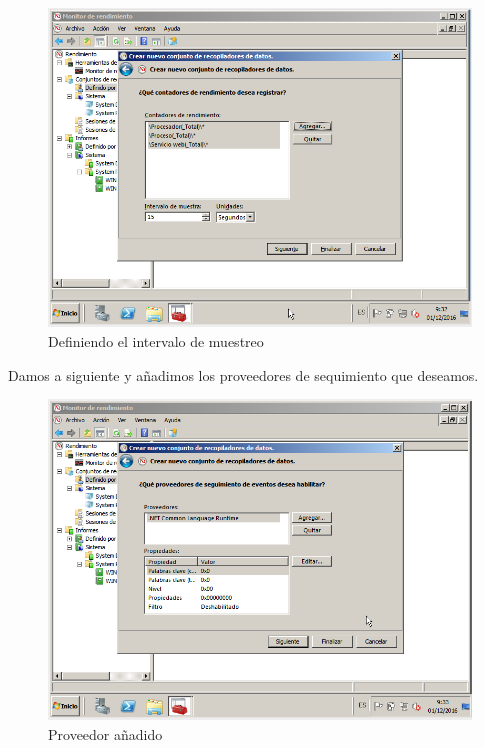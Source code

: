 \begin{figure}[H] %
	\centering
	\includegraphics[scale=0.5]{imagenes/CD-4.png}  %
	\caption{Definiendo el intervalo de muestreo}
\end{figure}

Damos a siguiente y añadimos los proveedores de sequimiento que deseamos.

\begin{figure}[H] %
	\centering
	\includegraphics[scale=0.5]{imagenes/CD-5.png}  %
	\caption{Proveedor añadido}
\end{figure}

